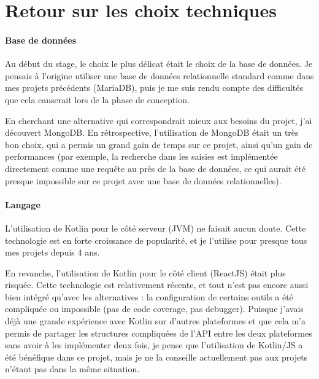 \section{Retour sur les choix techniques}\label{sec:retour-sur-les-choix-techniques}

\paragraph{Base de données}
Au début du stage, le choix le plus délicat était le choix de la base de données.
Je pensais à l'origine utiliser une base de données relationnelle standard comme dans mes projets précédents (MariaDB), puis je me suis rendu compte des difficultés que cela causerait lors de la phase de conception.

En cherchant une alternative qui correspondrait mieux aux besoins du projet, j'ai découvert MongoDB\@.
En rétrospective, l'utilisation de MongoDB était un très bon choix, qui a permis un grand gain de temps sur ce projet, ainsi qu'un gain de performances (par exemple, la recherche dans les saisies est implémentée directement comme une requête au près de la base de données, ce qui aurait été presque impossible sur ce projet avec une base de données relationnelles).

\paragraph{Langage}
L'utilisation de Kotlin pour le côté serveur (JVM) ne faisait aucun doute.
Cette technologie est en forte croissance de popularité, et je l'utilise pour presque tous mes projets depuis 4 ans.

En revanche, l'utilisation de Kotlin pour le côté client (ReactJS) était plus risquée.
Cette technologie est relativement récente, et tout n'est pas encore aussi bien intégré qu'avec les alternatives : la configuration de certains outils a été compliquée ou impossible (pas de code coverage, pas debugger).
Puisque j'avais déjà une grande expérience avec Kotlin sur d'autres plateformes et que cela m'a permis de partager les structures compliquées de l'API entre les deux plateformes sans avoir à les implémenter deux fois, je pense que l'utilisation de Kotlin/JS a été bénéfique dans ce projet, mais je ne la conseille actuellement pas aux projets n'étant pas dans la même situation.

